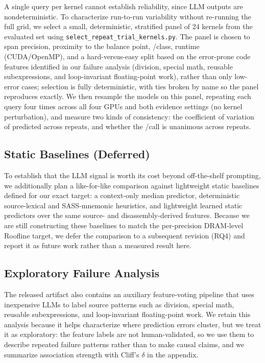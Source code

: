 A single query per kernel cannot establish reliability, since LLM outputs are nondeterministic.
To characterize run-to-run variability without re-running the full grid, we select a small, deterministic, stratified panel of 24 kernels from the evaluated set using \texttt{select\_repeat\_trial\_kernels.py}.
The panel is chosen to span precision, proximity to the balance point, \bandwidthbound/\computebound class, runtime (CUDA/OpenMP), and a hard-versus-easy split based on the error-prone code features identified in our failure analysis (division, special math, reusable subexpressions, and loop-invariant floating-point work), rather than only low-error cases; selection is fully deterministic, with ties broken by name so the panel reproduces exactly.
We then resample the models on this panel, repeating each query four times across all four GPUs and both evidence settings (no kernel perturbation), and measure two kinds of consistency: the coefficient of variation of predicted \rai across repeats, and whether the \bandwidthbound/\computebound call is unanimous across repeats.

\subsection{Static Baselines (Deferred)}

To establish that the LLM signal is worth its cost beyond off-the-shelf prompting, we additionally plan a like-for-like comparison against lightweight static baselines defined for our exact target: a context-only median predictor, deterministic source-lexical and SASS-mnemonic heuristics, and lightweight learned static predictors over the same source- and disassembly-derived features.
Because we are still constructing these baselines to match the per-precision DRAM-level Roofline target, we defer the comparison to a subsequent revision (RQ4) and report it as future work rather than a measured result here.

\subsection{Exploratory Failure Analysis}

The released artifact also contains an auxiliary feature-voting pipeline that uses inexpensive LLMs to label source patterns such as division, special math, reusable subexpressions, and loop-invariant floating-point work.
We retain this analysis because it helps characterize where prediction errors cluster, but we treat it as exploratory: the feature labels are not human-validated, so we use them to describe repeated failure patterns rather than to make causal claims, and we summarize association strength with Cliff's $\delta$ in the appendix.
